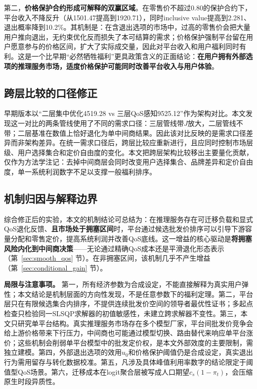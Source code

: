 \documentclass[UTF8,11pt]{ctexart}
\begin{document}
第二，\textbf{价格保护合约形成可解释的双赢区域}。在零售价不超过0.80的保护合约下，平台收入不降反升（从1501.47提高到1920.71），同时inclusive value提高到2.281、退出概率降到10.2\%。其机制是：在含退出选项的市场中，过高的零售价会把大量用户推向退出，无约束优化反而损失了本可结算的需求；价格保护强制平台留在用户愿意参与的价格区间，扩大了实际成交量，因此对平台收入和用户福利同时有利。这是一个比早期“必然牺牲福利”更具政策含义的正面结论：\textbf{在用户拥有外部选项的推理服务市场，适度价格保护可能同时改善平台收入与用户体验}。

\subsection{跨层比较的口径修正}
\label{sec:cross_layer}

早期版本以“二层集中优化4519.28 vs 三层QoS感知9525.12”作为架构对比。本文发现这一对比的两条管线使用了不同的需求口径：三层管线带$J$放大，二层管线不带；二层基准在数值上恰好退化为单中间商结果。因此该对比反映的是需求口径差异而非架构差异。在统一需求口径后，跨层比较应重新进行，且应同时控制市场层级、用户选择集合和定价自由度的变化。本文把跨层架构比较移出主要量化贡献，仅作为方法学注记：去掉中间商层会同时改变用户选择集合、品牌差异和定价自由度，单一系统利润数字不足以支撑一般福利排序。

\subsection{机制归因与解释边界}
\label{sec:discussion}

综合修正后的实验，本文的机制结论可总结为：在推理服务存在可迁移负载和显式QoS退化反馈、\textbf{且市场处于拥塞区间}时，平台通过候选批发价排序可以引导下游容量分配和零售定价，提高系统利润并改善QoS底线。这一增益的核心驱动是\textbf{将拥塞风险内化到中间商决策}——无论通过精确QoS成本还是平滑退化形态表示（第~\ref{sec:smooth_qos} 节）。在非拥塞区间，该机制几乎不产生增益（第~\ref{sec:conditional_gain} 节）。

\textbf{局限与注意事项。} 第一，所有经济参数为合成设定，不能直接解释为真实用户弹性；本文结论是机制层面的方向性发现，不是任意参数下的福利定理。第二，平台层只在有限候选集合内排序，不提供连续批发价空间的领导者最优性证书；多起点检查只检验同一SLSQP求解器的初值敏感性，未建立跨求解器不变性。第三，本文只研究单平台结构。真实推理服务市场存在多个模型厂家，平台间批发价竞争会给上游价格带来下行压力，中间商也可能通过模型切换、路由替代来响应单平台涨价；这些机制会削弱单平台模型中的批发定价权，是本文外部效度的主要限制，需独立建模。第四，外部退出选项的效用$u_0$和价格保护阈值仍是合成设定，真实退出行为需用留存与转化数据校准。第五，凡涉及具体峰值利用率数字的结论限定于阈值型QoS场景。第六，迁移成本在logit聚合层被写成人口期望$c_s(1-\pi_t)$，会压缩原生时段异质性。
\end{document}
